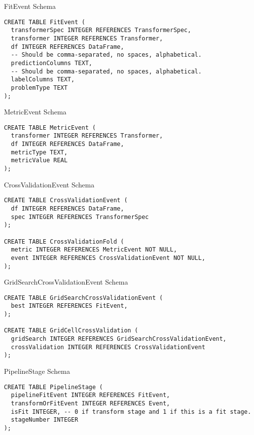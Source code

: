 \begin{listing}
\caption{FitEvent Schema}
\begin{verbatim}
CREATE TABLE FitEvent (
  transformerSpec INTEGER REFERENCES TransformerSpec,
  transformer INTEGER REFERENCES Transformer,
  df INTEGER REFERENCES DataFrame,
  -- Should be comma-separated, no spaces, alphabetical.
  predictionColumns TEXT, 
  -- Should be comma-separated, no spaces, alphabetical.
  labelColumns TEXT, 
  problemType TEXT 
);
\end{verbatim}
\label{listing:fitevent}
\end{listing}

\begin{listing}
\caption{MetricEvent Schema}
\begin{verbatim}
CREATE TABLE MetricEvent (
  transformer INTEGER REFERENCES Transformer,
  df INTEGER REFERENCES DataFrame,
  metricType TEXT,
  metricValue REAL
);
\end{verbatim}
\label{listing:metricevent}
\end{listing}

\begin{listing}
\caption{CrossValidationEvent Schema}
\begin{verbatim}
CREATE TABLE CrossValidationEvent (
  df INTEGER REFERENCES DataFrame,
  spec INTEGER REFERENCES TransformerSpec
);

CREATE TABLE CrossValidationFold (
  metric INTEGER REFERENCES MetricEvent NOT NULL,
  event INTEGER REFERENCES CrossValidationEvent NOT NULL,
);
\end{verbatim}
\label{listing:crossvalidationevent}
\end{listing}

\begin{listing}
\caption{GridSearchCrossValidationEvent Schema}
\begin{verbatim}
CREATE TABLE GridSearchCrossValidationEvent (
  best INTEGER REFERENCES FitEvent,
);

CREATE TABLE GridCellCrossValidation (
  gridSearch INTEGER REFERENCES GridSearchCrossValidationEvent,
  crossValidation INTEGER REFERENCES CrossValidationEvent
);
\end{verbatim}
\label{listing:gscve}
\end{listing}


\begin{listing}
\caption{PipelineStage Schema}
\begin{verbatim}
CREATE TABLE PipelineStage (
  pipelineFitEvent INTEGER REFERENCES FitEvent,
  transformOrFitEvent INTEGER REFERENCES Event,
  isFit INTEGER, -- 0 if transform stage and 1 if this is a fit stage.
  stageNumber INTEGER 
);
\end{verbatim}
\label{listing:pipelinestage}
\end{listing}

